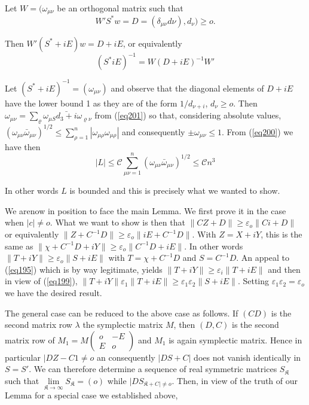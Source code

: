 	Let $W = (\omega_{\mu \nu}$ be an orthogonal matrix such that  
	$$
	W' S^* w=  D = (\delta_{\mu \nu }d \nu), d_\nu) \ge o.  
	$$

	Then $W' (S^* +i E) w= D +i E$, or equivalently
	\begin{equation*}
	(S^* i E)^{-1} = W (D + i E)^{-1} W' \tag{201}\label{eq201} 
	\end{equation*}

	Let $(S^*+ iE)^{-1}= (\omega_{\mu \nu})$ and observe that the
        diagonal elements of $D+i E$  have the lower bound 1 as they
        are of the form  $1/d_{\nu +i}$, $d_\nu \ge o$. Then
        $\omega_{\mu \nu}= \sum\limits_{\varrho} \omega_{\mu S}
        \bar{d_3 +i} \omega_{\varrho \nu}$ from (\ref{eq201}) so that,
        considering absolute values, $(\omega_{\mu\nu}
        \bar{\omega}_{\mu\nu})^{1/2} \leq \sum^n_{\rho=1}
        |\omega_{\mu\rho} \omega_{\mu \rho}|$ 
and consequently $\pm
        \omega_{\mu \nu} \le 1$. From (\ref{eq200}) we have then 
	$$
	|L| \le \mathscr{C} \sum_{\mu \nu=1}^{n} (\omega_{\mu \nu} 
        \bar{\omega}_{\mu \nu})^{1/2} \le \mathscr{C} n^3 
	$$

	In other words $L$ is bounded and this is precisely what we
        wanted to show. 

We are\pageoriginale now in position to face the main Lemma. We first
prove it in 
the case when $|c| \neq o$. What we want to show is then that $\| CZ
+D \| \ge \varepsilon_o \| C i +D\|$ or equivalently $\| Z+C^{-1}D\|
\ge \varepsilon_o \| i E +  C^{-1} D \|$. With $Z=X+i Y$, this is the
same as $\| \chi +  C^{-1} D+ i Y \|  \ge \varepsilon_o \| C^{-1}D+ i
E \|$. In other words $\| T +  i Y \| \ge \varepsilon_o \|  S + i E
\|$ with  $T = \chi +  C^{-1} D$  and $S= C^{-1}D$. An appeal to
(\ref{eq195}) which is by way legitimate, yields $\| T +  i Y \| \ge
\varepsilon_i \| T+ i E \|$ and then in view of (\ref{eq199}), $\| T +  i Y
\|  \varepsilon_1 \|  T+ i E \| \ge \varepsilon_1 \varepsilon_2 \|S +
i E \|$. Setting $\varepsilon_1 \varepsilon_2 = \varepsilon_o$ we have
the desired result. 

The general case can be reduced to the above case as follows. If $(C
D)$ is the second matrix row $\lambda$ the symplectic matrix $M$, then
$(D,C)$ is the second matrix row of $M_1 = M \begin{pmatrix} o & -E
  \\ E & o \end{pmatrix}$ and $M_1$ is again  symplectic matrix. Hence
in particular $| DZ-C1 \neq o$ an consequently $| DS +C |$ does not
vanish identically in $S= S'$. We can therefore  determine a sequence
of real  symmetric matrices $S_{\mathfrak{K}}$ such that
$\lim\limits_{\mathfrak{K} \to \infty} S_{\mathfrak{K}}= (o)$ while
$|DS_{\mathfrak{K}+C| \neq o}$. Then, in view of the truth of our Lemma
for a  special  case we established above, 

